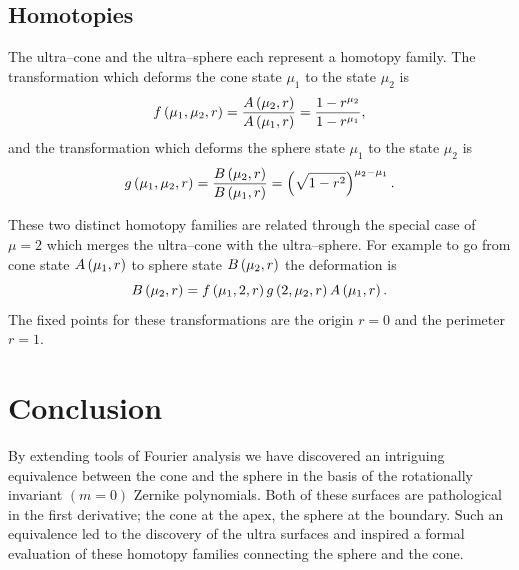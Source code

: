 \documentclass[preprint,12pt]{elsarticle}
\begin{document}
\subsection{Homotopies}
The ultra--cone and the ultra--sphere each represent a homotopy family. The transformation which deforms the cone state $\mu_{1}$ to the state $\mu_{2}$ is
  \begin{equation}
      f\left( \mu_{1}, \mu_{2},r \right) = \frac{A\left( \mu_{2},r \right)} {A\left( \mu_{1},r \right)} = \frac{1-r^{\mu_{2}}} {1-r^{\mu_{1}}},
  \end{equation}
and the transformation which deforms the sphere state $\mu_{1}$ to the state $\mu_{2}$ is
  \begin{equation}
      g\left( \mu_{1}, \mu_{2},r \right) = \frac{B\left( \mu_{2},r \right)} {B\left( \mu_{1},r \right)}  = \left( \sqrt{1-r^{2}} \right)^{\mu_{2} - \mu_{1}}.
  \end{equation}

These two distinct homotopy families are related through the special case of $\mu=2$ which merges the ultra--cone with the ultra--sphere. For example to go from cone state $A\left( \mu_{1},r \right)$ to sphere state $B\left( \mu_{2},r \right)$ the deformation is
\begin{equation}
  B\left( \mu_{2},r \right) = f\left( \mu_{1}, 2,r \right) g\left( 2, \mu_{2},r \right) A\left( \mu_{1},r \right).
\end{equation}
The fixed points for these transformations are the origin $r=0$ and the perimeter $r = 1$.

\section{Conclusion}
\label{sec:conclusion}
By extending tools of Fourier analysis we have discovered an intriguing equivalence between the cone and the sphere in the basis of the rotationally invariant $(m=0)$ Zernike polynomials. Both of these surfaces are pathological in the first derivative; the cone at the apex, the sphere at the boundary. Such an equivalence led to the discovery of the ultra surfaces and inspired a formal evaluation of these homotopy families connecting the sphere and the cone.
\end{document}
